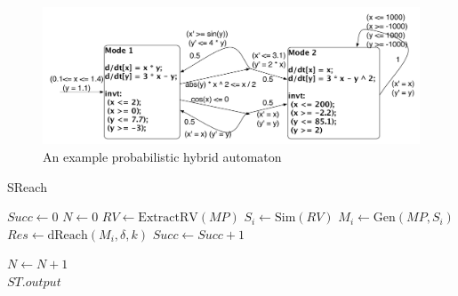 \vspace{-.2cm}
\begin{figure}
\centering
\includegraphics[width=\linewidth]{examplepha}
\caption{An example probabilistic hybrid automaton}
\vspace{-.4cm}
\label{fig:examplepha}
\end{figure}


\begin{algorithm}
  \centering
  \caption{SReach}
  \label{fig:sreach}
  \begin{algorithmic}[1]
        \State $Succ \gets 0$	
        \State $N \gets 0$
        \State $RV \gets \mathrm{ExtractRV}(MP)$	
        \Repeat
            \State $S_i \gets \mathrm{Sim}(RV)$		
            \State $M_i \gets \mathrm{Gen}(M\!P, S_i)$	
            \State $Res \gets \mathrm{dReach}(M_i, \delta, k)$	
		\State $Succ \gets Succ + 1$
	    
	  \EndIf
	\State $N \gets N + 1$
        \\
	\quad\hspace{0.5ex} \Return $ST.output$
   \EndFunction
  \end{algorithmic}
\end{algorithm}

